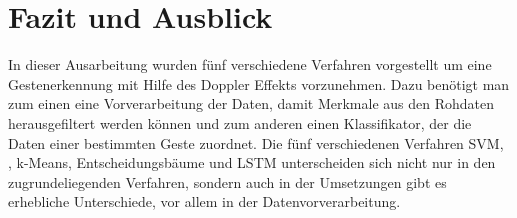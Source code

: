 \section{Fazit und Ausblick} 

In dieser Ausarbeitung wurden fünf verschiedene Verfahren vorgestellt um eine
Gestenerkennung mit Hilfe des Doppler Effekts vorzunehmen. Dazu benötigt man zum einen eine Vorverarbeitung der Daten, damit Merkmale aus den Rohdaten herausgefiltert werden können und zum anderen einen Klassifikator, der die Daten einer bestimmten Geste zuordnet. Die
fünf verschiedenen Verfahren \ac{SVM}, , k-Means, Entscheidungsbäume und
\ac{LSTM} unterscheiden sich nicht nur in den zugrundeliegenden Verfahren, sondern auch in
der Umsetzungen gibt es erhebliche Unterschiede, vor allem in der
Datenvorverarbeitung. 

